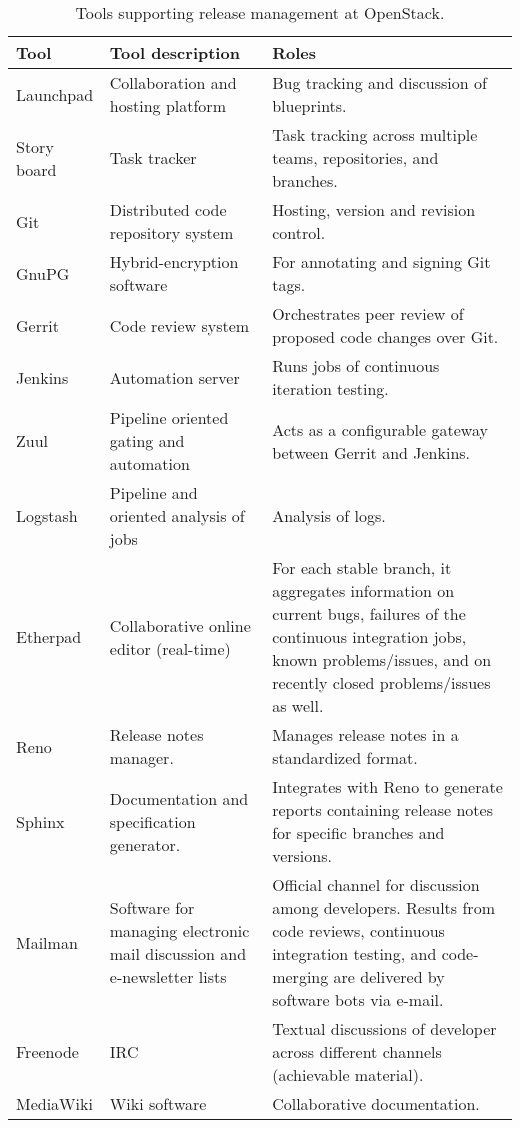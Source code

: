 \documentclass[dvipsnames]{bmcart}
\theoremstyle{definition}
\begin{document}
    









\begin{table}
\centering
\renewcommand{\arraystretch}{1.5}
\caption{Tools supporting release management at OpenStack.\label{t:tools}}
\begin{tabularx}{\textwidth}[]{
m{}
m{}
m{}
}
\toprule
Tool & Tool description & Roles\\
\midrule 
Launchpad & Collaboration and hosting platform & Bug tracking and discussion of blueprints.  \\ 
Story board & Task tracker  &  Task tracking across multiple teams, repositories, and branches.  \\
Git & Distributed code repository system  & Hosting, version and revision control.\\ 
GnuPG & Hybrid-encryption software & For annotating and signing Git tags. \\
Gerrit &  Code review system & Orchestrates peer review of proposed code changes over Git.\\
Jenkins & Automation server  & Runs jobs of continuous iteration testing.  \\
Zuul &  Pipeline oriented gating and automation  & Acts as a configurable gateway between Gerrit and Jenkins.  \\ 
Logstash & Pipeline and oriented analysis of jobs  & Analysis of logs. \\
Etherpad & Collaborative online editor (real-time) &  For each stable branch, it aggregates information on current bugs, failures of the continuous integration jobs, known problems/issues, and on recently closed problems/issues as well. \\
Reno & Release notes manager. &  Manages release notes in a standardized format.\\ 
Sphinx & Documentation and specification generator. & Integrates with Reno to generate reports containing release notes for specific branches and versions.\\
Mailman & Software for managing electronic mail discussion and e-newsletter lists &  Official channel for discussion among developers. Results from code reviews, continuous integration testing, and code-merging are delivered by software bots via e-mail.  \\
Freenode & IRC & Textual discussions of developer across different channels (achievable material).\\ 
MediaWiki & Wiki software & Collaborative documentation.\\ 


 \bottomrule
\end{tabularx}
\end{table}
\end{document}
